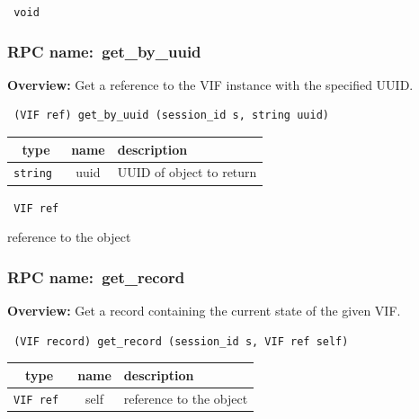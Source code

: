\vspace{0.3cm}

{\tt 
void
}



\vspace{0.3cm}
\vspace{0.3cm}
\vspace{0.3cm}
\subsubsection{RPC name:~get\_by\_uuid}

{\bf Overview:} 
Get a reference to the VIF instance with the specified UUID.

\begin{verbatim} (VIF ref) get_by_uuid (session_id s, string uuid)\end{verbatim}



 
\vspace{0.3cm}
\begin{tabular}{|c|c|p{7cm}|}
 \hline
{\bf type} & {\bf name} & {\bf description} \\ \hline
{\tt string } & uuid & UUID of object to return \\ \hline 

\end{tabular}

\vspace{0.3cm}

{\tt 
VIF ref
}


reference to the object
\vspace{0.3cm}
\vspace{0.3cm}
\vspace{0.3cm}
\subsubsection{RPC name:~get\_record}

{\bf Overview:} 
Get a record containing the current state of the given VIF.

\begin{verbatim} (VIF record) get_record (session_id s, VIF ref self)\end{verbatim}



 
\vspace{0.3cm}
\begin{tabular}{|c|c|p{7cm}|}
 \hline
{\bf type} & {\bf name} & {\bf description} \\ \hline
{\tt VIF ref } & self & reference to the object \\ \hline 

\end{tabular}

